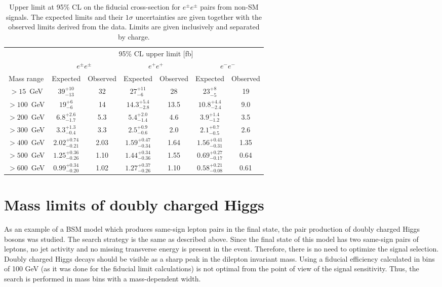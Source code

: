 \begin{table*}[!ht]
\begin{center}
\begin{tabular}{c||c|c||c|c||c|c}

 & \multicolumn{6}{c}{95\%  CL upper limit [fb]} \\
 & \multicolumn{2}{c||}{$e^{\pm}e^{\pm}$} & \multicolumn{2}{c||}{$e^{+}e^{+}$} & \multicolumn{2}{c}{$e^{-}e^{-}$} \\
Mass range & Expected & Observed & Expected & Observed & Expected & Observed \\
\hline
\rule{0pt}{3ex}
  $>15$~GeV   &  $39^{+10}_{-13}$        &  32    &    $27^{+11}_{-6}$         &  28    &    $23^{+8}_{-5}$          &  19\\
  $>100$~GeV  &  $19^{+6}_{-6}$          &  14    &    $14.3^{+5.4}_{-2.8}$    &  13.5  &    $10.8^{+4.4}_{-2.4}$    &  9.0\\
  $>200$~GeV  &  $6.8^{+2.6}_{-1.7}$     &  5.3   &    $5.4^{+2.0}_{-1.4}$     &  4.6   &    $3.9^{+1.4}_{-1.2}$     &  3.5\\
  $>300$~GeV  &  $3.3^{+1.3}_{-0.4}$     &  3.3   &    $2.5^{+0.9}_{-0.6}$     &  2.0   &    $2.1^{+0.7}_{-0.5}$     &  2.6\\
  $>400$~GeV  &  $2.02^{+0.74}_{-0.21}$  &  2.03  &    $1.59^{+0.47}_{-0.34}$  &  1.64  &    $1.56^{+0.41}_{-0.31}$  &  1.35\\
  $>500$~GeV  &  $1.25^{+0.36}_{-0.26}$  &  1.10  &    $1.44^{+0.34}_{-0.36}$  &  1.55  &    $0.69^{+0.27}_{-0.17}$  &  0.64\\
  $>600$~GeV  &  $0.99^{+0.34}_{-0.20}$  &  1.02  &    $1.27^{+0.37}_{-0.26}$  &  1.10  &    $0.58^{+0.21}_{-0.08}$  &  0.61\\

\end{tabular}
\end{center}
 \caption{Upper limit at 95\% CL on the fiducial cross-section for $e^{\pm} e^{\pm}$ pairs from non-SM signals. 
 The expected limits and their $1 \sigma$ uncertainties are given together with the observed limits derived from the data. 
 Limits are given inclusively and separated by charge.}
\label{tab:limits}
\end{table*}


\section{Mass limits of doubly charged Higgs}
As an example of a BSM model which produces same-sign lepton pairs in the final state, the pair production of doubly charged Higgs bosons was studied.
The search strategy is the same as described above.
Since the final state of this model has two same-sign pairs of leptons, no jet activity and no missing transverse energy is present in the event.
Therefore, there is no need to optimize the signal selection.
Doubly charged Higgs decays should be visible as a sharp peak in the dilepton invariant mass.
Using a fiducial efficiency calculated in bins of 100 GeV (as it was done for the fiducial limit calculations) is not optimal from the point of view of the signal sensitivity.
Thus, the search is performed in mass bins with a mass-dependent width.

